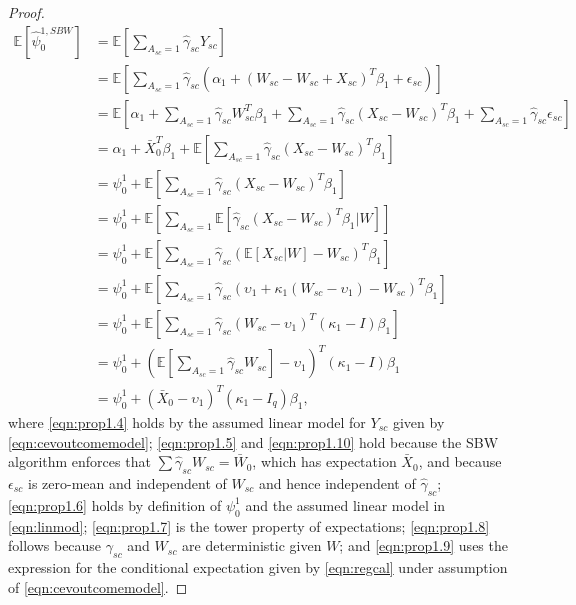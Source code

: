 \begin{proof}
\begin{align}
\nonumber	\mathbb{E}[\hat{\psi}_0^{1,SBW}] & = \mathbb{E}\left[ \sum_{A_{sc} = 1} \hat{\gamma}_{sc} Y_{sc}\right] \\
	& = \mathbb{E}\left[ \sum_{A_{sc}=1} \hat{\gamma}_{sc} \left(\alpha_1 + (W_{sc} - W_{sc} + X_{sc})^T \beta_1 + \epsilon_{sc}\right)\right] \label{eqn:prop1.4}\\
\nonumber	& = \mathbb{E}\left[ \alpha_1 + \sum_{A_{sc} = 1} \hat{\gamma}_{sc} W_{sc}^T \beta_1 + \sum_{A_{sc}=1} \hat{\gamma}_{sc} (X_{sc} - W_{sc})^T \beta_1 + \sum_{A_{sc}=1} \hat{\gamma}_{sc} \epsilon_{sc} \right] \\
	& = \alpha_1 + \bar{X}_0^T\beta_1 + \mathbb{E}\left[ \sum_{A_{sc} = 1} \hat{\gamma}_{sc}(X_{sc} - W_{sc})^T \beta_1\right] \label{eqn:prop1.5}\\
	& = \psi_0^1 + \mathbb{E} \left[ \sum_{A_{sc} = 1} \hat{\gamma}_{sc}(X_{sc} - W_{sc})^T \beta_1 \right] \label{eqn:prop1.6} \\
	& = \psi_0^1 + \mathbb{E} \left[ \sum_{A_{sc} = 1} \mathbb{E}\left[ \hat{\gamma}_{sc}(X_{sc} - W_{sc})^T \beta_1 | W \right] \right] \label{eqn:prop1.7} \\
	& = \psi_0^1 + \mathbb{E} \left[ \sum_{A_{sc} = 1}  \hat{\gamma}_{sc} (\mathbb{E}[X_{sc}|W] - W_{sc})^T \beta_1 \right] \label{eqn:prop1.8} \\
	& = \psi_0^1 + \mathbb{E} \left[ \sum_{A_{sc} = 1}  \hat{\gamma}_{sc} (\upsilon_1 + \kappa_1(W_{sc} - \upsilon_1) - W_{sc})^T \beta_1 \right] \label{eqn:prop1.9} \\
\nonumber	& = \psi_0^1 + \mathbb{E} \left[ \sum_{A_{sc} = 1}  \hat{\gamma}_{sc} (W_{sc} - \upsilon_1)^T(\kappa_1 - I)\beta_1 \right] \\
\nonumber	& = \psi_0^1 + \left(\mathbb{E}\left[\sum_{A_{sc} = 1} \hat{\gamma}_{sc} W_{sc}\right] - \upsilon_1\right)^T(\kappa_1 - I)\beta_1  \\
	& = \psi_0^1 + \left(\bar{X}_0 - \upsilon_1\right)^T(\kappa_1 - I_q)\beta_1,  \label{eqn:prop1.10}
\end{align}
%
where \eqref{eqn:prop1.4} holds by the assumed linear model for $Y_{sc}$ given by \eqref{eqn:cevoutcomemodel}; \eqref{eqn:prop1.5} and \eqref{eqn:prop1.10} hold because the SBW algorithm enforces that $\sum \hat{\gamma}_{sc} W_{sc} = \bar{W}_0$, which has expectation $\bar{X}_0$, and because $\epsilon_{sc}$ is zero-mean and independent of $W_{sc}$ and hence independent of $\hat{\gamma}_{sc}$; \eqref{eqn:prop1.6} holds by definition of $\psi_0^1$ and the assumed linear model in \eqref{eqn:linmod}; \eqref{eqn:prop1.7} is the tower property of expectations; \eqref{eqn:prop1.8} follows because $\gamma_{sc}$ and $W_{sc}$ are deterministic given $W$; and \eqref{eqn:prop1.9} uses the expression for the conditional expectation given by \eqref{eqn:regcal} under assumption of \eqref{eqn:cevoutcomemodel}.
\end{proof}

